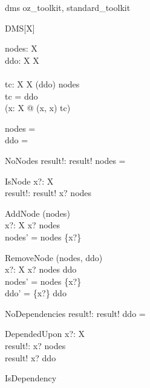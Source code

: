 \documentclass[11pt]{article}
\begin{document}
\begin{zsection}
  \SECTION dms \parents oz\_toolkit, standard\_toolkit
\end{zsection}

\begin{class}{DMS[X]}
\also
\begin{state}
  nodes: \finset X  \\
  ddo:  X  \rel  X  \\
  \Delta\\
  tc:  X  \rel  X  
\where
  \dom (ddo) \subseteq nodes \land \\ 
  tc = ddo\plus \land \\ 
  \lnot (\exists x:  X @ (x, x) \in tc)
\end{state}\classbreak
\begin{init}
  nodes = \emptyset \\ 
  ddo = \emptyset
\end{init}\classbreak
\begin{op}{NoNodes}
  result!:  \bool 
\where
  result! \iff nodes = \emptyset \\ 
\end{op}\classbreak
\begin{op}{IsNode}
  x?:  X  \\
  result!:  \bool  
\where
  result! \iff x? \in nodes
\end{op}\classbreak
\begin{op}{AddNode}
  \Delta (nodes)\\
  x?:  X  
\where
  x? \notin nodes \\ 
  nodes' = nodes \cup \{x?\}
\end{op}\classbreak
\begin{op}{RemoveNode}
  \Delta (nodes, ddo)\\
  x?:  X  
\where
  x? \in nodes \setminus  \ran ddo \\
  nodes' = nodes \setminus \{x?\} \land \\ 
  ddo' = \{x?\} \ndres ddo
\end{op}\classbreak
\begin{op}{NoDependencies}
  result!:  \bool  
\where
  result! \iff ddo = \emptyset
\end{op}\classbreak
\begin{op}{DependedUpon}
  x?:  X  \\
  result!:  \bool  
\where
  x? \in nodes\\
  result! \iff x? \in  \ran ddo
\end{op}\classbreak
\begin{op}{IsDependency}

\end{op}
\end{class}
\end{document}
